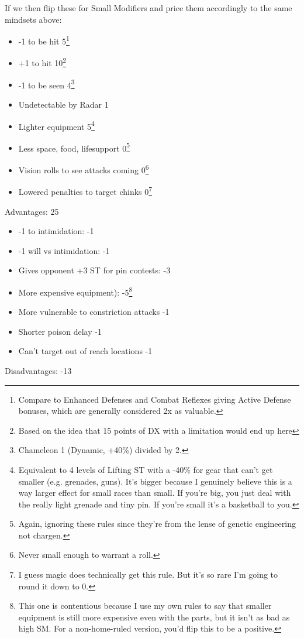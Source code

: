\begin{multicols*}{2}
	If we then flip these for Small Modifiers and price them accordingly to the same mindsets above:
	
	
	\begin{itemize}
		\itemsep 0pt
		\item 	-1 to be hit 5\footnote{Compare to Enhanced Defenses and Combat Reflexes giving Active Defense bonuses, which are generally considered 2x as valuable.}
		\item 	+1 to hit 10\footnote{Based on the idea that 15 points of DX with a limitation would end up here}
		\item 	-1 to be seen 4\footnote{Chameleon 1 (Dynamic, +40\%) divided by 2.}
		\item 	Undetectable by Radar 1
		\item 	Lighter equipment 5\footnote{Equivalent to 4 levels of Lifting ST with a -40\% for gear that can't get smaller (e.g. grenades, guns). It's bigger because I genuinely believe this is a way larger effect for small races than small. If you're big, you just deal with the really light grenade and tiny pin. If you're small it's a basketball to you.}
		\item	Less space, food, lifesupport 0\footnote{Again, ignoring these rules since they're from the lense of genetic engineering not chargen.}
		\item 	Vision rolls to see attacks coming 0\footnote{Never small enough to warrant a roll.}
		\item	Lowered penalties to target chinks 0\footnote{I guess magic does technically get this rule. But it's so rare I'm going to round it down to 0.}
	\end{itemize}
	Advantages: 25
	
	\begin{itemize}
		\itemsep 0pt
		\item 	-1 to intimidation: -1
		\item 	-1 will vs intimidation: -1
		\item 	Gives opponent +3 ST for pin contests: -3
		\item 	More expensive equipment): -5\footnote{This one is contentious because I use my own rules to say that smaller equipment is still more expensive even with the parts, but it isn't as bad as high SM. For a non-home-ruled version, you'd flip this to be a positive.}
		\item	More vulnerable to constriction attacks -1
		\item	Shorter poison delay -1
		\item	Can't target out of reach locations -1
	\end{itemize}
	Disadvantages: -13
	

\end{multicols*}
